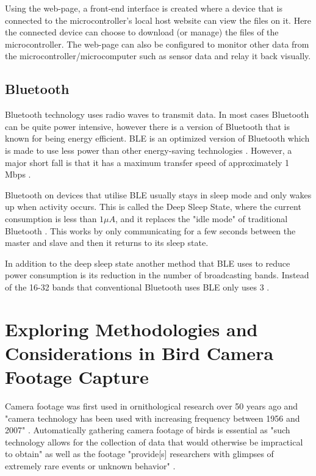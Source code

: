 \documentclass[class=report,11pt,crop=false]{standalone}
\begin{document}
Using the web-page, a front-end interface is created where a device that is connected to the microcontroller’s local host website can view the files on it. Here the connected device can choose to download (or manage) the files of the microcontroller. The web-page can also be configured to monitor other data from the microcontroller/microcomputer such as sensor data and relay it back visually.

\subsection{Bluetooth}
Bluetooth technology uses radio waves to transmit data. In most cases Bluetooth can be quite power intensive, however there is a version of Bluetooth that is known for being energy efficient.  \acrfull{BLE} is an optimized version of Bluetooth which is made to use less power than other energy-saving technologies \cite{BLE_Info}. However, a major short fall is that it has a maximum transfer speed of approximately 1 \acrshort{Mbps} \cite{BLE_Web}.

Bluetooth on devices that utilise \acrshort{BLE} usually stays in sleep mode and only wakes up when activity occurs. This is called the Deep Sleep State, where the current consumption is less than $1 \mu A$, and it replaces the "idle mode" of traditional Bluetooth \cite{BLE_Specs}. This works by only communicating for a few seconds between the master and slave and then it returns to its sleep state.

In addition to the deep sleep state another method that \acrshort{BLE} uses to reduce power consumption is its reduction in the number of broadcasting bands. Instead of the 16-32 bands that conventional Bluetooth uses \acrshort{BLE} only uses 3 \cite{BLE_Specs}.

\newpage
\section{Exploring Methodologies and Considerations in Bird Camera Footage Capture}

Camera footage was first used in ornithological research over 50 years ago \cite{CAMFirst} and "camera technology has been used with increasing frequency between 1956 and 2007" \cite[p.~190]{CAMDevelopmentOfNestMonitoring}. 
Automatically gathering camera footage of birds is essential as "such technology allows for the collection of data that would otherwise be impractical to obtain" \cite[p.~186]{CAMDevelopmentOfNestMonitoring} as well as the footage "provide[s] researchers with glimpses of extremely rare events or unknown behavior" \cite[p.~186]{CAMDevelopmentOfNestMonitoring}. 
\end{document}

